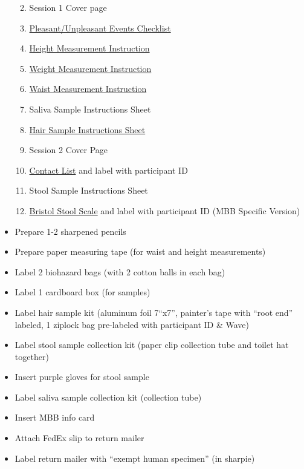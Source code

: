 \documentclass[]{book}
\providecommand{\tightlist}{%
  \setlength{\itemsep}{0pt}\setlength{\parskip}{0pt}}
\begin{document}
\begin{itemize}
  \begin{enumerate}
  \def\labelenumi{\arabic{enumi}.}
  \tightlist
  \item
    Session 1 Cover page
  \item
    \href{https://ucla.app.box.com/file/630327764749}{Pleasant/Unpleasant Events Checklist}
  \item
    \href{https://ucla.app.box.com/file/698389151155}{Height Measurement Instruction}
  \item
    \href{https://ucla.app.box.com/file/698395394087}{Weight Measurement Instruction}
  \item
    \href{https://ucla.app.box.com/file/698395657078}{Waist Measurement Instruction}
  \item
    Saliva Sample Instructions Sheet
  \item
    \href{https://ucla.app.box.com/file/685938821891}{Hair Sample Instructions Sheet}
  \item
    Session 2 Cover Page
  \item
    \href{https://ucla.app.box.com/file/639652767665}{Contact List} and label with participant ID
  \item
    Stool Sample Instructions Sheet
  \item
    \href{https://app.box.com/file/630326499609}{Bristol Stool Scale} and label with participant ID (MBB Specific Version)
  \end{enumerate}
\item
  Prepare 1-2 sharpened pencils
\item
  Prepare paper measuring tape (for waist and height measurements)
\item
  Label 2 biohazard bags (with 2 cotton balls in each bag)
\item
  Label 1 cardboard box (for samples)
\item
  Label hair sample kit (aluminum foil 7``x7'', painter's tape with ``root end'' labeled, 1 ziplock bag pre-labeled with participant ID \& Wave)
\item
  Label stool sample collection kit (paper clip collection tube and toilet hat together)
\item
  Insert purple gloves for stool sample
\item
  Label saliva sample collection kit (collection tube)
\item
  Insert MBB info card
\item
  Attach FedEx slip to return mailer
\item
  Label return mailer with ``exempt human specimen'' (in sharpie)

\end{itemize}
\end{document}
